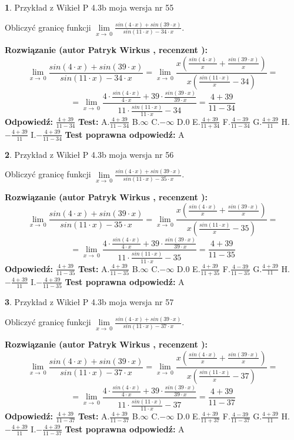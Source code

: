 \documentclass[12pt, a4paper]{article}
\theoremstyle{definition} %
\newtheorem{zad}{}
\newcommand{\zadStart}[1]{\begin{zad}#1\newline}
\newcommand{\zadStop}{\end{zad}}
\newcommand{\rozwStart}[2]{\noindent \textbf{Rozwiązanie (autor #1 , recenzent #2): }\newline}
\newcommand{\rozwStop}{\newline}
\newcommand{\odpStart}{\noindent \textbf{Odpowiedź:}\newline}
\newcommand{\odpStop}{\newline}
\newcommand{\testStart}{\noindent \textbf{Test:}\newline}
\newcommand{\testStop}{\newline}
\newcommand{\kluczStart}{\noindent \textbf{Test poprawna odpowiedź:}\newline}
\newcommand{\kluczStop}{\newline}
\begin{document}
\zadStart{Przykład z Wikieł P 4.3b moja wersja nr 55}


Obliczyć granicę funkcji $\lim\limits_{x\to\ 0}\frac{sin(4 \cdot x)+sin(39 \cdot x)}{sin(11 \cdot x)-34 \cdot x}$.
\zadStop
\rozwStart{Patryk Wirkus}{}
$$\lim\limits_{x\to\ 0}\frac{sin(4 \cdot x)+sin(39 \cdot x)}{sin(11 \cdot x)-34 \cdot x}=\lim\limits_{x\to\ 0}\frac{x(\frac{sin(4 \cdot x)}{x}+\frac{sin(39 \cdot x)}{x})}{x(\frac{sin(11 \cdot x)}{x}-34)}=$$
$$=\lim\limits_{x\to\ 0}\frac{4 \cdot \frac{sin(4 \cdot x)}{4 \cdot x}+39 \cdot \frac{sin(39 \cdot x)}{39 \cdot x}}{11 \cdot \frac{sin(11 \cdot x)}{11 \cdot x}-34}=\frac{4+39}{11-34}$$
\rozwStop
\odpStart
$\frac{4+39}{11-34}$
\odpStop
\testStart
A.$\frac{4+39}{11-34}$
B.$\infty$
C.$-\infty$
D.$0$
E.$\frac{4+39}{11+34}$
F.$\frac{4-39}{11-34}$
G.$\frac{4+39}{11}$
H.$-\frac{4+39}{11}$
I.$-\frac{4+39}{11-34}$
\testStop
\kluczStart
A
\kluczStop



\zadStart{Przykład z Wikieł P 4.3b moja wersja nr 56}


Obliczyć granicę funkcji $\lim\limits_{x\to\ 0}\frac{sin(4 \cdot x)+sin(39 \cdot x)}{sin(11 \cdot x)-35 \cdot x}$.
\zadStop
\rozwStart{Patryk Wirkus}{}
$$\lim\limits_{x\to\ 0}\frac{sin(4 \cdot x)+sin(39 \cdot x)}{sin(11 \cdot x)-35 \cdot x}=\lim\limits_{x\to\ 0}\frac{x(\frac{sin(4 \cdot x)}{x}+\frac{sin(39 \cdot x)}{x})}{x(\frac{sin(11 \cdot x)}{x}-35)}=$$
$$=\lim\limits_{x\to\ 0}\frac{4 \cdot \frac{sin(4 \cdot x)}{4 \cdot x}+39 \cdot \frac{sin(39 \cdot x)}{39 \cdot x}}{11 \cdot \frac{sin(11 \cdot x)}{11 \cdot x}-35}=\frac{4+39}{11-35}$$
\rozwStop
\odpStart
$\frac{4+39}{11-35}$
\odpStop
\testStart
A.$\frac{4+39}{11-35}$
B.$\infty$
C.$-\infty$
D.$0$
E.$\frac{4+39}{11+35}$
F.$\frac{4-39}{11-35}$
G.$\frac{4+39}{11}$
H.$-\frac{4+39}{11}$
I.$-\frac{4+39}{11-35}$
\testStop
\kluczStart
A
\kluczStop



\zadStart{Przykład z Wikieł P 4.3b moja wersja nr 57}


Obliczyć granicę funkcji $\lim\limits_{x\to\ 0}\frac{sin(4 \cdot x)+sin(39 \cdot x)}{sin(11 \cdot x)-37 \cdot x}$.
\zadStop
\rozwStart{Patryk Wirkus}{}
$$\lim\limits_{x\to\ 0}\frac{sin(4 \cdot x)+sin(39 \cdot x)}{sin(11 \cdot x)-37 \cdot x}=\lim\limits_{x\to\ 0}\frac{x(\frac{sin(4 \cdot x)}{x}+\frac{sin(39 \cdot x)}{x})}{x(\frac{sin(11 \cdot x)}{x}-37)}=$$
$$=\lim\limits_{x\to\ 0}\frac{4 \cdot \frac{sin(4 \cdot x)}{4 \cdot x}+39 \cdot \frac{sin(39 \cdot x)}{39 \cdot x}}{11 \cdot \frac{sin(11 \cdot x)}{11 \cdot x}-37}=\frac{4+39}{11-37}$$
\rozwStop
\odpStart
$\frac{4+39}{11-37}$
\odpStop
\testStart
A.$\frac{4+39}{11-37}$
B.$\infty$
C.$-\infty$
D.$0$
E.$\frac{4+39}{11+37}$
F.$\frac{4-39}{11-37}$
G.$\frac{4+39}{11}$
H.$-\frac{4+39}{11}$
I.$-\frac{4+39}{11-37}$
\testStop
\kluczStart
A
\kluczStop
\end{document}
